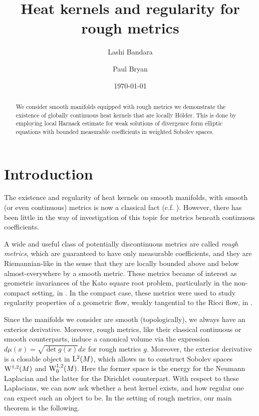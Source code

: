 \documentclass[a4paper, 12pt]{amsart}
\begin{document}
\title{Heat kernels and regularity for rough metrics}

\author{Lashi Bandara}
\author{Paul Bryan}

\curraddr{}
\email{}
\date{\today}

\dedicatory{}
\subjclass[2010]{}
\keywords{}

\parindent0cm
\setlength{\parskip}{\baselineskip}


\begin{abstract}
We consider smooth manifolds equipped with rough metrics
we demonstrate the existence of globally continuous
heat kernels that are locally Hölder. This is done 
by employing local Harnack estimate for weak
solutions of divergence form elliptic equations
with bounded measurable coefficients in weighted Sobolev
spaces.
\end{abstract}

\maketitle

\section{Introduction}
\label{sec:intro}
The existence and regularity of heat kernels on smooth manifolds, with smooth (or even continuous)
metrics is now a classical fact (c.f. \cite{}). However, there has been
little in the way of investigation
of this topic for metrics beneath continuous coefficients. 

A wide and useful class of potentially discontinuous metrics are called \emph{rough metrics}, 
which are guaranteed to have only measurable coefficients, and they are Riemannian-like in the sense
that they are locally bounded above and below almost-everywhere by a smooth metric.
These metrics became of interest as geometric invariances of the Kato square
root problem, particularly in the non-compact setting, in \cite{BMc, BRough}. 
In the compact case, these metrics were used to study regularity properties
of a geometric flow, weakly tangential to the Ricci flow, 
in \cite{BLM, BCont}. 

Since the manifolds we consider are smooth (topologically), we always have an 
exterior derivative. Moreover, rough metrics, like their classical continuous
or smooth counterparts, induce a canonical volume via the 
expression $d\mu(x) = \sqrt{\det g(x)} dx$ for rough metrics $g$.
Moreover, the exterior derivative is a closable object
in $\Lp{2}(M)$, which allows us to construct Sobolev spaces $\SobH{1}(M)$ 
and $\SobH[0]{1}(M)$. Here the  
former space is the  energy for the Neumann Laplacian
and the latter for the Dirichlet counterpart.
With respect to these Laplacians, we can now ask
whether a heat kernel exists, and how regular one
can expect such an object to be. In the setting of rough metrics, our main theorem
is the following. 
\end{document}
